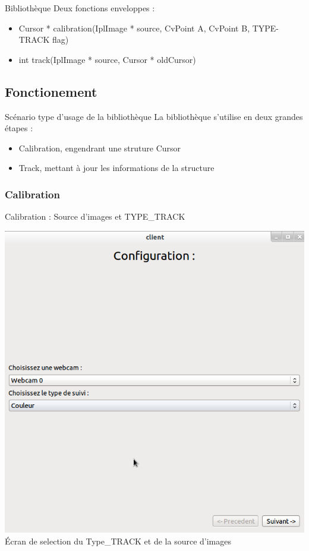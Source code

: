 \documentclass{beamer}
\begin{document}
		\begin{frame}{Bibliothèque}
		Deux fonctions enveloppes : \\
			\begin{itemize}
				\item{Cursor * calibration(IplImage * source, CvPoint A, CvPoint B, TYPE-TRACK flag)}
				\item{int track(IplImage * source, Cursor * oldCursor)}
			\end{itemize}		
		\end{frame}

		\subsection{Fonctionement}
		\begin{frame}{Scénario type d'usage de la bibliothèque}
			La bibliothèque s'utilise en deux grandes étapes :
			\begin{itemize}
				\item{Calibration, engendrant une struture Cursor}
				\item{Track, mettant à jour les informations de la structure}
			\end{itemize}
		\end{frame}

		\subsubsection{Calibration}
		\begin{frame}{Calibration : Source d'images et TYPE\_TRACK}
			\begin{center}
				\includegraphics[scale=0.25]{Capture6.png}\\
				Écran de selection du Type\_TRACK et de la source d'images
			\end{center}
		\end{frame}
\end{document}
